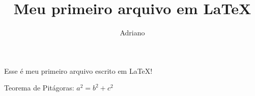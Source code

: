 \documentclass{article}
\author{Adriano}
\title{Meu primeiro arquivo em \LaTeX}
\begin{document}
\maketitle

Esse \'e meu primeiro arquivo escrito em \LaTeX!

Teorema de Pit\'agoras: $a^2=b^2+c^2$
\end{document}
